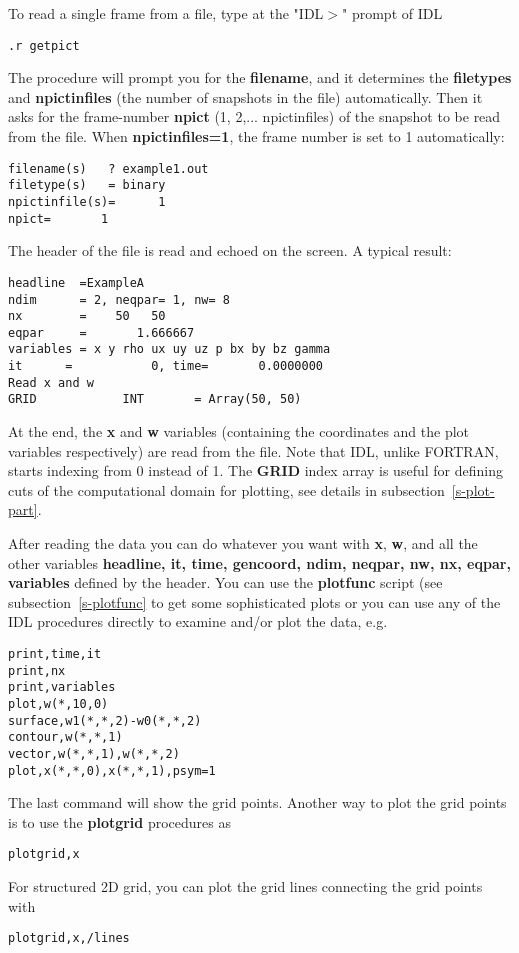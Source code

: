    To read a single frame from a file, type at the "IDL$>$" prompt of IDL
\begin{verbatim}
.r getpict
\end{verbatim}
   The procedure will prompt you for the {\bf filename}, 
   and it determines the {\bf filetypes} and {\bf npictinfiles}
   (the number of snapshots in the file) automatically. Then it asks for
   the frame-number {\bf npict} (1, 2,... npictinfiles) 
   of the snapshot to be read from the file. When {\bf npictinfiles=1},
   the frame number is set to 1 automatically:
\begin{verbatim}
filename(s)   ? example1.out
filetype(s)   = binary
npictinfile(s)=      1
npict=       1
\end{verbatim}
   The header of the file is read and echoed on the screen. 
   A typical result:
\begin{verbatim}
headline  =ExampleA
ndim      = 2, neqpar= 1, nw= 8
nx        =    50   50
eqpar     =       1.666667
variables = x y rho ux uy uz p bx by bz gamma
it      =           0, time=       0.0000000
Read x and w
GRID            INT       = Array(50, 50)
\end{verbatim}
   At the end, the {\bf x} and {\bf w} variables (containing the coordinates 
   and the plot variables respectively) are read from the file. 
   Note that IDL, unlike FORTRAN, starts indexing from 0 instead of 1. 
   The {\bf GRID} index array is useful for defining
   cuts of the computational domain for plotting, see details 
   in subsection~\ref{s-plot-part}. 

   After reading the data you can do whatever you want with {\bf x}, {\bf w}, 
   and all the other variables 
   {\bf headline, it, time, gencoord, ndim, neqpar, nw, nx, eqpar, variables}
   defined by the header. 
   You can use the {\bf plotfunc} script (see subsection~\ref{s-plotfunc}
   to get some sophisticated plots or you can use any of the IDL procedures 
   directly to examine and/or plot the data, e.g.
\begin{verbatim}
print,time,it
print,nx
print,variables
plot,w(*,10,0)
surface,w1(*,*,2)-w0(*,*,2)
contour,w(*,*,1)
vector,w(*,*,1),w(*,*,2)
plot,x(*,*,0),x(*,*,1),psym=1
\end{verbatim}
   The last command will show the grid points. Another way to plot the
   grid points is to use the {\bf plotgrid} procedures as
\begin{verbatim}
plotgrid,x
\end{verbatim}
   For structured 2D grid, you can plot the grid lines connecting
   the grid points with 
\begin{verbatim}
plotgrid,x,/lines
\end{verbatim}

